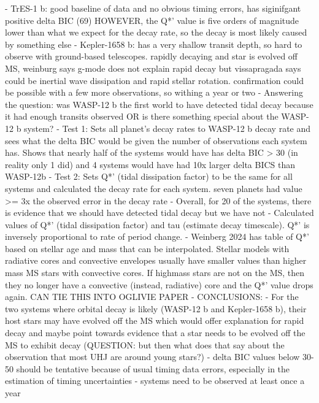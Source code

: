 \documentclass[oneside,12pt]{amsart}
\numberwithin{page}{section}
\begin{document}
    - TrES-1 b: good baseline of data and no obvious timing errors, has siginifgant positive delta BIC (69) HOWEVER, the Q*' value is five orders of magnitude lower than what we expect for the decay rate, so the decay is most likely caused by something else
    - Kepler-1658 b: has a very shallow transit depth, so hard to observe with ground-based telescopes. rapidly decaying and star is evolved off MS, weinburg says g-mode does not explain rapid decay but vissapragada says could be inertial wave dissipation and rapid stellar rotation. confirmation could be possible with a few more observations, so withing a year or two
- Answering the question: was WASP-12 b the first world to have detected tidal decay because it had enough transits observed OR is there something special about the WASP-12 b system?
    - Test 1: Sets all planet's decay rates to WASP-12 b decay rate and sees what the delta BIC would be given the number of observations each system has. Shows that nearly half of the systems would have has delta BIC > 30 (in reality only 1 did) and 4 systems would have had 10x larger delta BICS than WASP-12b
    - Test 2: Sets Q*' (tidal dissipation factor) to be the same for all systems and calculated the decay rate for each system. seven planets had value >= 3x the observed error in the decay rate
    - Overall, for 20 of the systems, there is evidence that we should have detected tidal decay but we have not
- Calculated values of Q*' (tidal dissipation factor) and tau (estimate decay timescale). Q*' is inversely proportional to rate of period change. 
- Weinberg 2024 has table of Q*' based on stellar age and mass that can be interpolated. Stellar models with radiative cores and convective envelopes usually have smaller values than higher mass MS stars with convective cores. If highmass stars are not on the MS, then they no longer have a convective (instead, radiative) core and the Q*' value drops again. CAN TIE THIS INTO OGLIVIE PAPER
- CONCLUSIONS: 
    - For the two systems where orbital decay is likely (WASP-12 b and Kepler-1658 b), their host stars may have evolved off the MS which would offer explanation for rapid decay and maybe point towards evidence that a star needs to be evolved off the MS to exhibit decay (QUESTION: but then what does that say about the observation that most UHJ are around young stars?)
    - delta BIC values below 30-50 should be tentative because of usual timing data errors, especially in the estimation of timing uncertainties
    - systems need to be observed at least once a year
    
\end{document}
